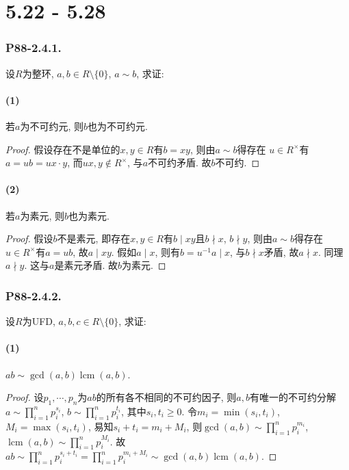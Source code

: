\documentclass[12pt, a4paper, fontset=windows]{ctexart}
\newcommand{\lcm}{\operatorname{lcm}}
\newcommand{\unit}[1]{{#1}^\times}
\begin{document}
\clearpage
\part{5.22 - 5.28}

\section*{P88-2.4.1.}

设$R$为整环, $a,b\in R\setminus\{0\}$, $a\sim b$, 求证: 

\subsection*{(1)}

若$a$为不可约元, 则$b$也为不可约元. 

\begin{proof}
假设存在不是单位的$x,y\in R$有$b=xy$, 则由$a\sim b$得存在
$u\in\unit{R}$有$a=ub=ux\cdot y$, 而$ux,y\notin\unit{R}$, 
与$a$不可约矛盾. 故$b$不可约. 
\end{proof}

\subsection*{(2)}

若$a$为素元, 则$b$也为素元. 

\begin{proof}
假设$b$不是素元, 即存在$x,y\in R$有$b\mid xy$且$b\nmid x$, 
$b\nmid y$, 则由$a\sim b$得存在$u\in\unit{R}$有$a=ub$, 
故$a\mid xy$. 假如$a\mid x$, 则有$b=u^{-1}a\mid x$, 
与$b\nmid x$矛盾, 故$a\nmid x$. 同理$a\nmid y$. 这与$a$是素元矛盾. 故$b$为素元. 
\end{proof}

\section*{P88-2.4.2.}

设$R$为UFD, $a,b,c\in R\setminus\{0\}$, 求证: 

\subsection*{(1)}

$ab\sim\gcd(a,b)\lcm(a,b)$. 

\begin{proof}
设$p_1,\cdots,p_n$为$ab$的所有各不相同的不可约因子, 
则$a,b$有唯一的不可约分解$a\sim\prod^n_{i=1}p_i^{s_i}$, 
$b\sim\prod^n_{i=1}p_i^{t_i}$, 其中$s_i,t_i\ge 0$. 
令$m_i=\min(s_i,t_i)$, $M_i=\max(s_i,t_i)$, 
易知$s_i+t_i=m_i+M_i$, 则$\gcd(a,b)\sim\prod^n_{i=1}p_i^{m_i}$, 
$\lcm(a,b)\sim\prod^n_{i=1}p_i^{M_i}$. 
故$ab\sim\prod^n_{i=1}p_i^{s_i+t_i}=\prod^n_{i=1}p_i^{m_i+M_i}\sim\gcd(a,b)\lcm(a,b)$. 
\end{proof}
\end{document}
